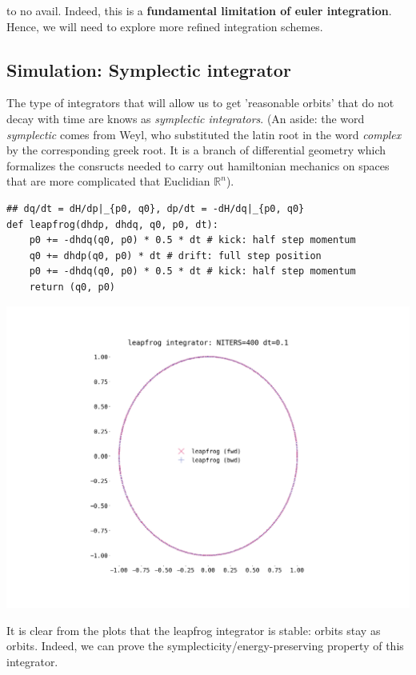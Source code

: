 \documentclass[titlepage]{article}
\newcommand{\R}{\mathbb{R}}
\begin{document}
to no avail. Indeed, this is a \textbf{fundamental limitation of euler integration}.
Hence, we will need to explore more refined integration schemes.

\subsection{Simulation: Symplectic integrator}

The type of integrators that will allow us to get 'reasonable orbits' that
do not decay with time are knows as \emph{symplectic integrators}.
(An aside: the word \emph{symplectic} comes from Weyl, who substituted
the latin root in the word \emph{complex} by the corresponding greek root.
It is a branch of differential geometry which formalizes the consructs
needed to carry out hamiltonian mechanics on spaces that are more complicated
that Euclidian $\R^n$).

\begin{verbatim}
## dq/dt = dH/dp|_{p0, q0}, dp/dt = -dH/dq|_{p0, q0}
def leapfrog(dhdp, dhdq, q0, p0, dt):
    p0 += -dhdq(q0, p0) * 0.5 * dt # kick: half step momentum
    q0 += dhdp(q0, p0) * dt # drift: full step position
    p0 += -dhdq(q0, p0) * 0.5 * dt # kick: half step momentum
    return (q0, p0)
\end{verbatim}


\includegraphics[width=\textwidth]{./leapfrog-dt-0-1.png}

It is clear from the plots that the leapfrog integrator is stable: orbits
stay as orbits. Indeed, we can prove the symplecticity/energy-preserving
property of this integrator.
\end{document}
